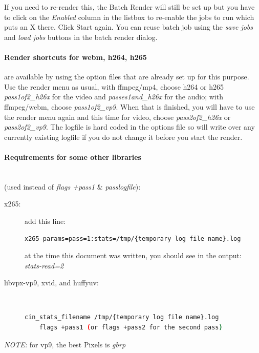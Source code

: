If you need to re-render this, the Batch Render will still be set up but you have to click on the \textit{Enabled} column in the listbox to re-enable the jobs to run which puts an X there.  Click Start again. You can reuse batch job using the \textit{save jobs} and \textit{load jobs} buttons in the batch render dialog.

\paragraph{Render shortcuts for webm, h264, h265} are available by using the option files that are already set up for this purpose.  Use the render menu as usual, with ffmpeg/mp4, choose h264 or h265 \textit{pass1of2\_h26x} for the video and \textit{passes1and\_h26x} for the audio; 
with ffmpeg/webm, choose \textit{pass1of2\_vp9}.  When that is finished, you will have to use the render menu again and this time for video, choose \textit{pass2of2\_h26x} or \textit{pass2of2\_vp9}.  The logfile is hard coded in the options file so will write over any currently existing logfile if you do not change it before you start the render.

\paragraph{Requirements for some other libraries} ~\\ (used instead of \textit{flags +pass1} \& \textit{passlogfile}):

\begin{description}
    \item[x265:] add this line:
    \begin{lstlisting}[language=bash,numbers=none]
x265-params=pass=1:stats=/tmp/{temporary log file name}.log
    \end{lstlisting}      
    at the time this document was written, you should see in the output: \\  \textit{stats-read=2}
    
    \item[libvpx-vp9, xvid, and huffyuv:]~

    \begin{lstlisting}[language=bash,numbers=none]
    cin_stats_filename /tmp/{temporary log file name}.log
    flags +pass1 (or flags +pass2 for the second pass)
    \end{lstlisting}    
\end{description}

\textit{NOTE:} for vp9, the best Pixels is \textit{gbrp}


